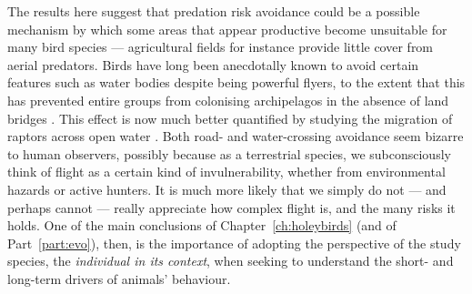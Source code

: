 The results here suggest that predation risk avoidance could be a possible mechanism by which some areas that appear productive become unsuitable for many bird species --- agricultural fields for instance provide little cover from aerial predators.
Birds have long been anecdotally known to avoid certain features such as water bodies despite being powerful flyers, to the extent that this has prevented entire groups from colonising archipelagos in the absence of land bridges \citep{diamond1981}.
This effect is now much better quantified by studying the migration of raptors across open water \citep{nourani2020}.
Both road- and water-crossing avoidance seem bizarre to human observers, possibly because as a terrestrial species, we subconsciously think of flight as a certain kind of invulnerability, whether from environmental hazards or active hunters.
It is much more likely that we simply do not --- and perhaps cannot --- really appreciate how complex flight is, and the many risks it holds.
One of the main conclusions of Chapter~\ref{ch:holeybirds} (and of Part~\ref{part:evo}), then, is the importance of adopting the perspective of the study species, the \textit{individual in its context}, when seeking to understand the short- and long-term drivers of animals' behaviour.


